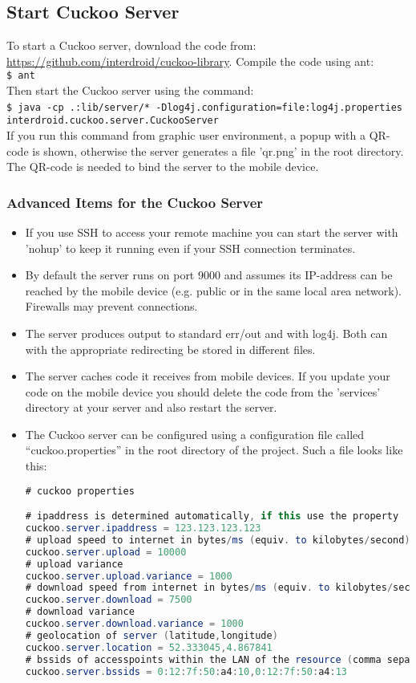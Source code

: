 \documentclass{article}
\begin{document}
\subsection{Start Cuckoo Server}
To start a Cuckoo server, download the code from:
\url{https://github.com/interdroid/cuckoo-library}. Compile the code using ant:
\\
\verb!$ ant!\\
Then start the Cuckoo server using the command:\\
\verb!$ java -cp .:lib/server/* -Dlog4j.configuration=file:log4j.properties!
\verb!  interdroid.cuckoo.server.CuckooServer! \\
If you run this command from graphic user environment, a popup with a QR-code is
shown, otherwise the server generates a file 'qr.png' in the root directory. The
QR-code is needed to bind the server to the mobile device.

\subsubsection{Advanced Items for the Cuckoo Server}
\begin{itemize}
  \item If you use SSH to access your remote machine you can start the server with
'nohup' to keep it running even if your SSH connection terminates.
\item By default the server runs on port 9000 and assumes its IP-address can be
reached by the mobile device (e.g. public or in the same local area network).
Firewalls may prevent connections. 
\item The server produces output to standard err/out and with log4j. Both can
with the appropriate redirecting be stored in different files.
\item The server caches code it receives from mobile devices. If you update your
code on the mobile device you should delete the code from the 'services'
directory at your server and also restart the server.
\item The Cuckoo server can be configured using a configuration file called
``cuckoo.properties'' in the root directory of the project. Such a file looks
like this:\\

\begin{lstlisting}[language=java]
# cuckoo properties

# ipaddress is determined automatically, if this use the property
cuckoo.server.ipaddress = 123.123.123.123
# upload speed to internet in bytes/ms (equiv. to kilobytes/second)
cuckoo.server.upload = 10000
# upload variance
cuckoo.server.upload.variance = 1000
# download speed from internet in bytes/ms (equiv. to kilobytes/second)
cuckoo.server.download = 7500
# download variance
cuckoo.server.download.variance = 1000
# geolocation of server (latitude,longitude)
cuckoo.server.location = 52.333045,4.867841
# bssids of accesspoints within the LAN of the resource (comma separated list)
cuckoo.server.bssids = 0:12:7f:50:a4:10,0:12:7f:50:a4:13

\end{lstlisting}
\end{itemize}
\end{document}
